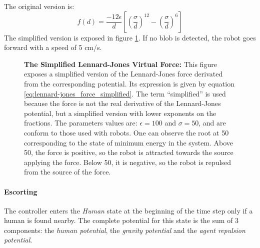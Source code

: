 \documentclass[oneside, a4paper, 12pt]{memoir}
\let\oldCaption\caption
\renewcommand{\caption}[2]{
\oldCaption[#1]{{\small\sffamily\bfseries #1:} #2}
}
\begin{document}
				The original version is:
				\begin{equation}
					f(d) = \frac{-12\epsilon}{d} \left[ \left(\frac{\sigma}{d}\right)^{12} - \left(\frac{\sigma}{d}\right)^6 \right]
				\end{equation}
				 The simplified version is exposed in figure \ref{fig:lennard-jones_force_simplified}. If no blob is detected, the robot goes forward with a speed of 5 cm/s.
				
				\begin{figure}\centering
					
					\caption{The Simplified Lennard-Jones Virtual Force}{This figure exposes a simplified version of the Lennard-Jones force derivated from the corresponding potential. Its expression is given by equation \ref{eq:lennard-jones_force_simplified}. The term \enquote{simplified} is used because the force is not the real derivative of the Lennard-Jones potential, but a simplified version with lower exponents on the fractions. The parameters values are: $\epsilon=100$ and $\sigma=50$, and are conform to those used with robots. One can observe the root at 50 corresponding to the state of minimum energy in the system. Above 50, the force is positive, so the robot is attracted towards the source applying the force. Below 50, it is negative, so the robot is repulsed from the source of the force.}
					\label{fig:lennard-jones_force_simplified}
				\end{figure}
			
			\paragraph{Escorting}
			
			The controller enters the \emph{Human} state at the beginning of the time step only if a human is found nearby. The complete potential for this state is the sum of 3 components: the \emph{human potential}, the \emph{gravity potential} and the \emph{agent repulsion potential}.
			
\end{document}
